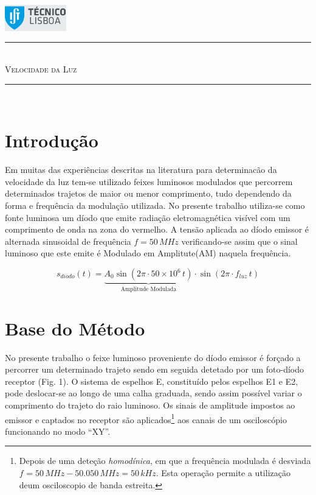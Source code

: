 \documentclass[a4paper,12pt]{article}      %
\author{Prof. Bernardo B. Carvalho}
\date{ Outubro 2012}
\newcommand{\HRule}{\rule{\linewidth}{0.5mm}}
\begin{document}
 

	\includegraphics[width=0.2\textwidth]{../logo-ist}%

	\HRule \\[0.5cm]
	{ \huge \sf  \textsc{Velocidade da Luz} }\\[0.4cm] %
	\HRule \\%

\section{\sf Introdução}
Em muitas das experiências descritas na literatura para
determinacão da velocidade da luz tem-se utilizado feixes luminosos
modulados que percorrem determinados trajetos de maior ou menor
comprimento, tudo dependendo da forma e frequência da modulação
utilizada. 
No presente trabalho utiliza-se como fonte luminosa um díodo que
emite radiação eletromagnética visível com um comprimento de onda na
zona do vermelho. A tensão aplicada ao díodo emissor é alternada
sinusoidal de frequência $f=50\,MHz$ verificando-se assim que o sinal luminoso
que este emite é Modulado em Amplitute(AM) naquela frequência. 

\begin{equation*}
	\label{eq:f_am}
		s_{diodo}(t) = \underbrace{A_0 \sin ( 2\pi \cdot 50\times 10^6 \, t)}_\text{Amplitude Modulada} \cdot \sin ( 2\pi \cdot f_{luz} \, t)
\end{equation*}


\section{\sf Base do Método}
No presente trabalho o feixe luminoso proveniente do díodo emissor
é forçado a percorrer um determinado trajeto sendo em seguida detetado
por um foto-díodo receptor (Fig. 1). O sistema de espelhos E, constituído
pelos espelhos E1 e E2, pode deslocar-se ao longo de uma calha graduada,
sendo assim possível variar o comprimento do trajeto do raio luminoso. Os
sinais de amplitude impostos ao emissor e captados no receptor são aplicados\footnote{Depois de uma deteção \emph{homodínica}, em que a frequência modulada é desviada $f_{}=50\, MHz -50.050\, MHz = 50\,kHz$. Esta operação permite a utilização deum osciloscopio de banda estreita.} 
aos canais de um osciloscópio funcionando no modo “XY”.
\end{document}
